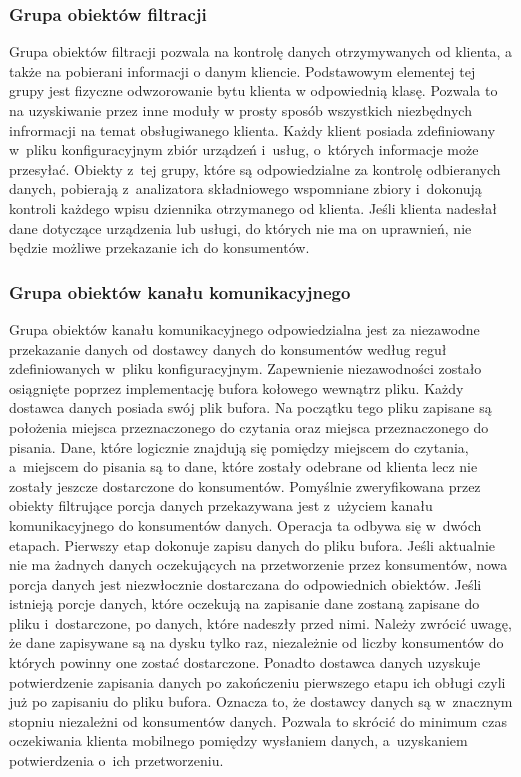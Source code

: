 \subsubsection[Grupa obiektów filtracji][Grupa obiektów
filtracji]{Grupa obiektów filtracji}

Grupa obiektów filtracji pozwala na kontrolę danych otrzymywanych od
klienta, a także na pobierani informacji o danym kliencie. Podstawowym
elementej tej grupy jest fizyczne odwzorowanie bytu klienta w
odpowiednią klasę. Pozwala to na uzyskiwanie przez inne moduły w
prosty sposób wszystkich niezbędnych infrormacji na temat
obsługiwanego klienta. Każdy klient posiada zdefiniowany w~pliku
konfiguracyjnym zbiór urządzeń i~usług, o~których informacje może
przesyłać. Obiekty z~tej grupy, które są odpowiedzialne za kontrolę
odbieranych danych, pobierają z~analizatora składniowego wspomniane
zbiory i~dokonują kontroli każdego wpisu dziennika otrzymanego od
klienta. Jeśli klienta nadesłał dane dotyczące urządzenia lub usługi,
do których nie ma on uprawnień, nie będzie możliwe przekazanie ich do
konsumentów.

\subsubsection[Grupa obiektów kanału komunikacyjnego][Grupa obiektów
kanału komunikacyjnego]{Grupa obiektów kanału komunikacyjnego}

Grupa obiektów kanału komunikacyjnego odpowiedzialna jest za
niezawodne przekazanie danych od dostawcy danych do konsumentów według
reguł zdefiniowanych w~pliku konfiguracyjnym. Zapewnienie
niezawodności zostało osiągnięte poprzez implementację bufora kołowego
wewnątrz pliku. Każdy dostawca danych posiada swój plik bufora. Na
początku tego pliku zapisane są położenia miejsca przeznaczonego do
czytania oraz miejsca przeznaczonego do pisania. Dane, które logicznie
znajdują się pomiędzy miejscem do czytania, a~miejscem do pisania są
to dane, które zostały odebrane od klienta lecz nie zostały jeszcze
dostarczone do konsumentów. Pomyślnie zweryfikowana przez obiekty
filtrujące porcja danych przekazywana jest z~użyciem kanału
komunikacyjnego do konsumentów danych. Operacja ta odbywa się w~dwóch
etapach. Pierwszy etap dokonuje zapisu danych do pliku bufora. Jeśli
aktualnie nie ma żadnych danych oczekujących na przetworzenie przez
konsumentów, nowa porcja danych jest niezwłocznie dostarczana do
odpowiednich obiektów. Jeśli istnieją porcje danych, które oczekują na
zapisanie dane zostaną zapisane do pliku i~dostarczone, po danych,
które nadeszły przed nimi. Należy zwrócić uwagę, że dane zapisywane są
na dysku tylko raz, niezależnie od liczby konsumentów do których
powinny one zostać dostarczone. Ponadto dostawca danych uzyskuje
potwierdzenie zapisania danych po zakończeniu pierwszego etapu ich
obługi czyli już po zapisaniu do pliku bufora. Oznacza to, że dostawcy
danych są w~znacznym stopniu niezależni od konsumentów danych. Pozwala
to skrócić do minimum czas oczekiwania klienta mobilnego pomiędzy
wysłaniem danych, a~uzyskaniem potwierdzenia o~ich przetworzeniu.

